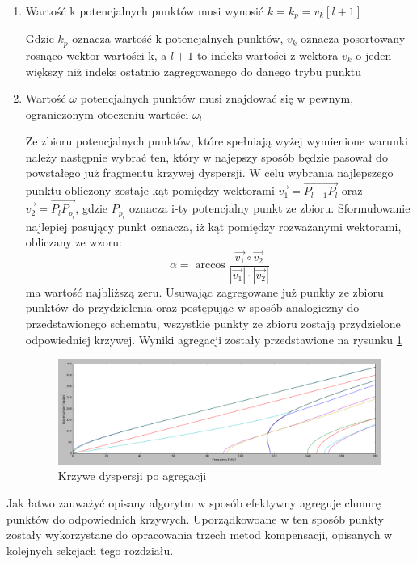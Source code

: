  \begin{enumerate}
 \item Wartość k potencjalnych punktów musi wynosić $k=k_p=v_k[l+1]$
 
 Gdzie $k_p$ oznacza wartość k potencjalnych punktów, $v_k$ oznacza posortowany rosnąco wektor wartości k, a $l+1$ to indeks wartości z wektora $v_k$ o jeden większy niż indeks ostatnio zagregowanego do danego trybu punktu
 \item Wartość $\omega$ potencjalnych punktów musi znajdować się w pewnym, ograniczonym otoczeniu wartości $\omega _l$
 
 Ze zbioru potencjalnych punktów, które spełniają wyżej wymienione warunki należy następnie wybrać ten, który w najepszy sposób będzie pasował do powstałego już fragmentu krzywej dyspersji. W celu wybrania najlepszego punktu obliczony zostaje kąt pomiędzy wektorami $\overrightarrow{v_1} = \overrightarrow{P_{l-1}P_l}$ oraz $\overrightarrow{v_2} = \overrightarrow{P_lP_{p_i}}$, gdzie $P_{p_i}$ oznacza i-ty potencjalny punkt ze zbioru. Sformułowanie najlepiej pasujący punkt oznacza, iż kąt pomiędzy rozważanymi wektorami, obliczany ze wzoru:
 \begin{equation}
 \alpha = \arccos\frac{\overrightarrow{v_1} \circ \overrightarrow{v_2}}{|\overrightarrow{v_1}|\cdot|\overrightarrow{v_2}|}
\end{equation}  
ma wartość najbliższą zeru. Usuwając zagregowane już punkty ze zbioru punktów do przydzielenia oraz postępując w sposób analogiczny do przedstawionego schematu, wszystkie punkty ze zbioru zostają przydzielone odpowiedniej krzywej. Wyniki agregacji zostały przedstawione na rysunku \ref{fig:krzywe_po_agregacji}
 
\begin{figure}[h]
\centering
\includegraphics[width=13cm]{Zdjecia/4/zagregowane_krzywe}
\caption{Krzywe dyspersji po agregacji}
\label{fig:krzywe_po_agregacji}
\end{figure}
\end{enumerate}  

Jak łatwo zauważyć opisany algorytm w sposób efektywny agreguje chmurę punktów do odpowiednich krzywych. Uporządkowoane w ten sposób punkty zostały wykorzystane do opracowania trzech metod kompensacji, opisanych w kolejnych sekcjach tego rozdziału.




